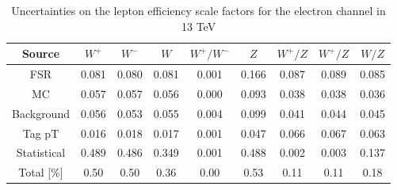 \begin{table}[htbp]
\begin{center}
\begin{tabular}{ccccccccc}
\hline
Source & $W^+$& $W^-$ & $W$ & $W^+/W^-$ & $Z$ & $W^+/Z$&$W^+/Z$ &$W/Z$  \\
\hline \hline
FSR & 0.081 & 0.080 & 0.081 & 0.001 & 0.166 & 0.087 & 0.089 & 0.085 \\
MC & 0.057 & 0.057 & 0.056 & 0.000 & 0.093 & 0.038 & 0.038 & 0.036 \\
Background & 0.056 & 0.053 & 0.055 & 0.004 & 0.099 & 0.041 & 0.044 & 0.045 \\
Tag pT & 0.016 & 0.018 & 0.017 & 0.001 & 0.047 & 0.066 & 0.067 & 0.063 \\
Statistical & 0.489 & 0.486 & 0.349 & 0.001 & 0.488 & 0.002 & 0.003 & 0.137 \\
\hline \hline
Total [\%] & 0.50 & 0.50 & 0.36 & 0.00 & 0.53 & 0.11 & 0.11 & 0.18 \\


\end{tabular}
\end{center}
\caption{Uncertainties on the lepton efficiency scale factors for the electron channel in 13 TeV}
\label{tab:Eff:Unc:ele:summary:13}
\end{table}